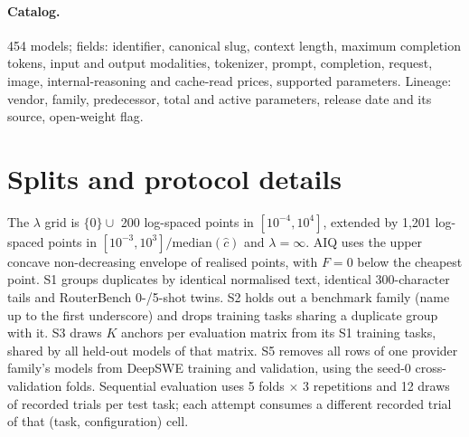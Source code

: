 \documentclass[11pt,a4paper]{article}
\theoremstyle{definition}
\theoremstyle{remark}
\theoremstyle{definition}
\begin{document}
\paragraph{Catalog.} 454 models; fields: identifier, canonical slug, context length, maximum completion tokens, input and output modalities, tokenizer, prompt, completion, request, image, internal-reasoning and cache-read prices, supported parameters. Lineage: vendor, family, predecessor, total and active parameters, release date and its source, open-weight flag.

\section{Splits and protocol details}
\label{app:splits}
The $\lambda$ grid is $\{0\}\cup$ 200 log-spaced points in $[10^{-4},10^{4}]$, extended by 1{,}201 log-spaced points in $[10^{-3},10^{3}]/\mathrm{median}(\hat c)$ and $\lambda=\infty$. AIQ uses the upper concave non-decreasing envelope of realised points, with $F=0$ below the cheapest point. S1 groups duplicates by identical normalised text, identical 300-character tails and RouterBench 0-/5-shot twins. S2 holds out a benchmark family (name up to the first underscore) and drops training tasks sharing a duplicate group with it. S3 draws $K$ anchors per evaluation matrix from its S1 training tasks, shared by all held-out models of that matrix. S5 removes all rows of one provider family's models from DeepSWE training and validation, using the seed-0 cross-validation folds. Sequential evaluation uses 5 folds $\times$ 3 repetitions and 12 draws of recorded trials per test task; each attempt consumes a different recorded trial of that (task, configuration) cell.
\end{document}
